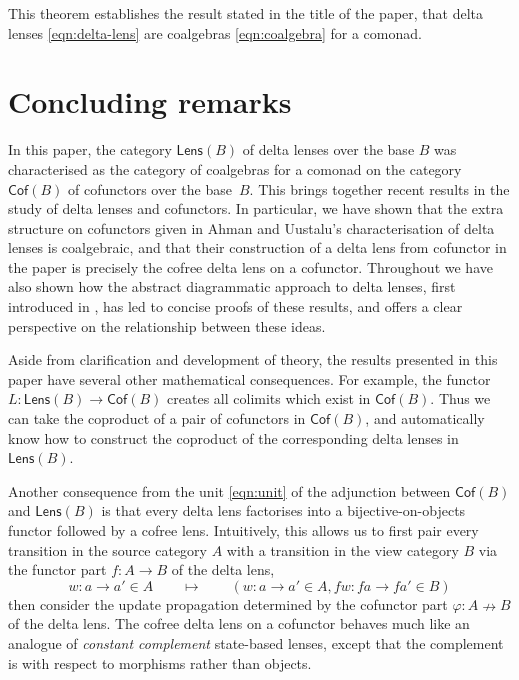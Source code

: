 \documentclass[colorlinks = true, a4paper, oneside, reqno, 11pt]{amsart}
\theoremstyle{definition}
\theoremstyle{remark}
\newcommand{\Cof}{\mathsf{Cof}}
\newcommand{\Lens}{\mathsf{Lens}}
\begin{document}
This theorem establishes the result stated in the title of the paper, 
that delta lenses \eqref{eqn:delta-lens} 
are coalgebras \eqref{eqn:coalgebra} for a comonad. 

\section{Concluding remarks}
\label{sec:conclusion}

In this paper, the category $\Lens(B)$ of delta lenses over the base $B$ 
was characterised as the category of coalgebras for a comonad on 
the category $\Cof(B)$ of cofunctors over the base~$B$. 
This brings together recent results in the study of delta lenses and 
cofunctors. 
In particular, we have shown that the extra structure on cofunctors
given in Ahman and Uustalu's \cite{AU17} characterisation of delta lenses
is coalgebraic, and that their construction of a delta lens from cofunctor 
in the paper \cite{AU16} is precisely the cofree delta lens on a cofunctor. 
Throughout we have also shown how the abstract diagrammatic approach to 
delta lenses, first introduced in \cite{Cla20}, has led to concise 
proofs of these results, and offers a clear perspective on the relationship 
between these ideas. 

Aside from clarification and development of theory, the results presented
in this paper have several other mathematical consequences. 
For example, the functor $L \colon \Lens(B) \rightarrow \Cof(B)$ 
creates all colimits which exist in $\Cof(B)$. 
Thus we can take the coproduct of a pair of cofunctors in $\Cof(B)$, 
and automatically know how to construct the coproduct of the 
corresponding delta lenses in $\Lens(B)$. 

Another consequence from the unit \eqref{eqn:unit} of the adjunction 
between $\Cof(B)$ and $\Lens(B)$ is that every delta lens factorises 
into a bijective-on-objects functor followed by a cofree lens. 
Intuitively, this allows us to first pair every transition in the 
source category $A$ with a transition in the view category $B$ 
via the functor part $f \colon A \rightarrow B$ of the delta lens, 
\[
	w \colon a \rightarrow a' \in A 
	\qquad \longmapsto \qquad 
	(w \colon a \rightarrow a' \in A, fw \colon fa \rightarrow fa' \in B) 
\]
then consider the update propagation determined by the cofunctor 
part $\varphi \colon A \nrightarrow B$ of the delta lens. 
The cofree delta lens on a cofunctor behaves much like an analogue 
of \emph{constant complement} state-based lenses, except that the 
complement is with respect to morphisms rather than objects. 
\end{document}
